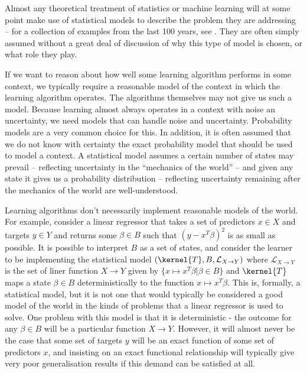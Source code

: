 Almost any theoretical treatment of statistics or machine learning will at some point make use of statistical models to describe the problem they are addressing -- for a collection of examples from the last 100 years, see \cite{Goodfellow-et-al-2016,vapnik_nature_2013,bishop_pattern_2006,le_cam_comparison_1996,freedman_asymptotic_1963,wald_statistical_1950,de_finetti_foresight_1992,fisher_statistical_1992}. They are often simply assumed without a great deal of discussion of why this type of model is chosen, or what role they play.

If we want to reason about how well some learning algorithm performs in some context, we typically require a reasonable model of the context in which the learning algorithm operates. The algorithms themselves may not give us such a model. Because learning almost always operates in a context with noise an uncertainty, we need models that can handle noise and uncertainty. Probability models are a very common choice for this. In addition, it is often assumed that we do not know with certainty the exact probability model that should be used to model a context. A statistical model assumes a certain number of states may prevail -- reflecting uncertainty in the ``mechanics of the world'' -- and given any state it gives us a probability distribution -- reflecting uncertainty remaining after the mechanics of the world are well-understood.

Learning algorithms don't necessarily implement reasonable models of the world. For example, consider a linear regressor that takes a set of predictors $x\in X$ and targets $y\in Y$ and returns some $\beta\in B$ such that $(y-x^T\beta)^2$ is as small as possible. It is possible to interpret $B$ as a set of states, and consider the learner to be implementing the statistical model $(\kernel{T},B,\mathcal{L}_{X\to Y})$ where $\mathcal{L}_{X\to Y}$ is the set of liner function $X\to Y$ given by $\{x\mapsto x^T\beta|\beta\in B\}$ and $\kernel{T}$ maps a state $\beta\in B$ deterministically to the function $x\mapsto x^T\beta$. This is, formally, a statistical model, but it is not one that would typically be considered a good model of the world in the kinds of problems that a linear regressor is used to solve. One problem with this model is that it is deterministic - the outcome for any $\beta\in B$ will be a particular function $X\to Y$. However, it will almost never be the case that some set of targets $y$ will be an exact function of some set of predictors $x$, and insisting on an exact functional relationship will typically give very poor generalisation results if this demand can be satisfied at all.

